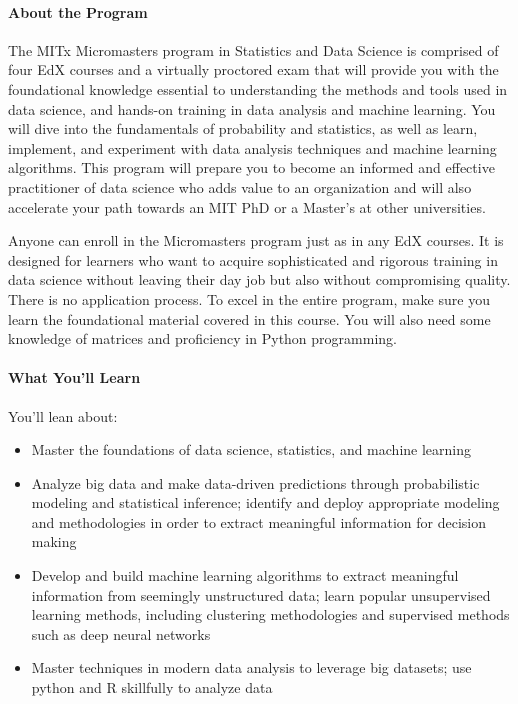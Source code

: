 \documentclass[pdftex, brazil, 12pt, twoside]{article}
\begin{document}
\paragraph{About the Program} The MITx Micromasters program in Statistics and Data
Science is comprised of four EdX courses and a virtually proctored exam that will
provide you with the foundational knowledge essential to understanding the methods
and tools used in data science, and hands-on training in data analysis and machine
learning. You will dive into the fundamentals of probability and statistics, as well
as learn, implement, and experiment with data analysis techniques and machine learning
algorithms. This program will prepare you to become an informed and effective practitioner
of data science who adds value to an organization and will also accelerate your path
towards an MIT PhD or a Master's at other universities.

Anyone can enroll in the Micromasters program just as in any EdX courses. It is designed
for learners who want to acquire sophisticated and rigorous training in data science
without leaving their day job but also without compromising quality. There is no
application process. To excel in the entire program, make sure you learn the
foundational material covered in this course. You will also need some knowledge of
matrices and proficiency in Python programming.

\paragraph{What You'll Learn} You'll lean about:

\begin{itemize}[noitemsep]
\item Master the foundations of data science, statistics, and machine learning
\item Analyze big data and make data-driven predictions through probabilistic
  modeling and statistical inference; identify and deploy appropriate modeling
  and methodologies in order to extract meaningful information for decision making
\item Develop and build machine learning algorithms to extract meaningful information
  from seemingly unstructured data; learn popular unsupervised learning methods,
  including clustering methodologies and supervised methods such as deep neural networks
\item Master techniques in modern data analysis to leverage big datasets; use python
  and R skillfully to analyze data
\end{itemize}
\end{document}
